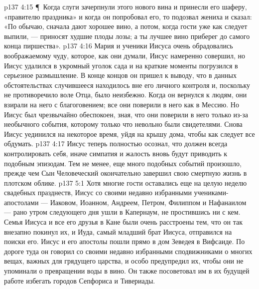 \vs p137 4:15 \P\ Когда слуги зачерпнули этого нового вина и принесли его шаферу, «правителю праздника» и когда он попробовал его, то подозвал жениха и сказал: «По обычаю, сначала дают хорошее вино, а потом, когда гости уже как следует выпили, --- приносят худшие плоды лозы; а ты лучшее вино приберег до самого конца пиршества».
\vs p137 4:16 Мария и ученики Иисуса очень обрадовались воображаемому чуду, которое, как они думали, Иисус намеренно совершил, но Иисус удалился в укромный уголок сада и на краткие моменты погрузился в серьезное размышление. В конце концов он пришел к выводу, что в данных обстоятельствах случившееся находилось вне его личного контроля и, поскольку не противоречило воле Отца, было неизбежно. Когда он вернулся к людям, они взирали на него с благоговением; все они поверили в него как в Мессию. Но Иисус был чрезвычайно обеспокоен, зная, что они поверили в него только из\hyp{}за необычного события, которому только что невольно были свидетелями. Снова Иисус уединился на некоторое время, уйдя на крышу дома, чтобы как следует все обдумать.
\vs p137 4:17 Иисус теперь полностью осознал, что должен всегда контролировать себя, иначе симпатия и жалость вновь будут приводить к подобным эпизодам. Тем не менее, еще много подобных событий произошло, прежде чем Сын Человеческий окончательно завершил свою смертную жизнь в плотском облике.
\vs p137 5:1 Хотя многие гости оставались еще на целую неделю свадебных празднеств, Иисус со своими недавно избранными учениками\hyp{}апостолами --- Иаковом, Иоанном, Андреем, Петром, Филиппом и Нафанаилом --- рано утром следующего дня ушли в Капернаум, не простившись ни с кем. Семья Иисуса и все его друзья в Кане были очень расстроены тем, что он так внезапно покинул их, и Иуда, самый младший брат Иисуса, отправился на поиски его. Иисус и его апостолы пошли прямо в дом Зеведея в Вифсаиде. По дороге туда он говорил со своими недавно избранными сподвижниками о многих вещах, важных для грядущего царства, и особо предупредил их, чтобы они не упоминали о превращении воды в вино. Он также посоветовал им в их будущей работе избегать городов Сепфориса и Тивериады.
